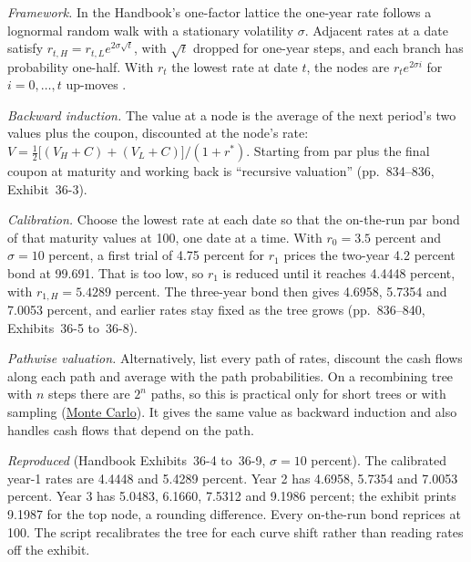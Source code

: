 \begin{qfmethod}\label{meth:binomial-rate-tree-calibration}
 \emph{Framework.} In the Handbook's one-factor lattice the one-year rate follows a lognormal random walk with a stationary volatility $\sigma$. Adjacent rates at a date satisfy $r_{t,H}=r_{t,L}e^{2\sigma\sqrt t}$, with $\sqrt t$ dropped for one-year steps, and each branch has probability one-half. With $r_t$ the lowest rate at date $t$, the nodes are $r_te^{2\sigma i}$ for $i=0,\dots,t$ up-moves \citep[chap.~36, pp.~832--834, Exhibits~36-1 and~36-2]{s7-fabozzifixed}.

\emph{Backward induction.} The value at a node is the average of the next period's two values plus the coupon, discounted at the node's rate: $V=\tfrac12\bigl[(V_H+C)+(V_L+C)\bigr]/(1+r^*)$. Starting from par plus the final coupon at maturity and working back is ``recursive valuation'' (pp.~834--836, Exhibit~36-3).

\emph{Calibration.} Choose the lowest rate at each date so that the on-the-run par bond of that maturity values at 100, one date at a time. With $r_0=3.5$ percent and $\sigma=10$ percent, a first trial of 4.75 percent for $r_1$ prices the two-year 4.2 percent bond at 99.691. That is too low, so $r_1$ is reduced until it reaches 4.4448 percent, with $r_{1,H}=5.4289$ percent. The three-year bond then gives 4.6958, 5.7354 and 7.0053 percent, and earlier rates stay fixed as the tree grows (pp.~836--840, Exhibits~36-5 to~36-8).

\emph{Pathwise valuation.} Alternatively, list every path of rates, discount the cash flows along each path and average with the path probabilities. On a recombining tree with $n$ steps there are $2^n$ paths, so this is practical only for short trees or with sampling (\hyperref[mod:term-structure-models-simulation]{Monte Carlo}). It gives the same value as backward induction and also handles cash flows that depend on the path.

 \emph{Reproduced} (Handbook Exhibits~36-4 to~36-9, $\sigma=10$ percent). The calibrated year-1 rates are 4.4448 and 5.4289 percent. Year 2 has 4.6958, 5.7354 and 7.0053 percent. Year 3 has 5.0483, 6.1660, 7.5312 and 9.1986 percent; the exhibit prints 9.1987 for the top node, a rounding difference. Every on-the-run bond reprices at 100. The script recalibrates the tree for each curve shift rather than reading rates off the exhibit.


\end{qfmethod}
